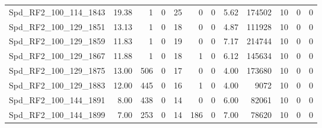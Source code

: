 \begin{longtable}[c]{@{}lrrrrrrrrrrr@{}}
Spd\_RF2\_100\_114\_1843     & 19.38                  & 1                       & 0                       & 25                     & 0                       & 0                       & 5.62                    & 174502                   & 10                       & 0                        & 0                        \\
Spd\_RF2\_100\_129\_1851     & 13.13                  & 1                       & 0                       & 18                     & 0                       & 0                       & 4.87                    & 111928                   & 10                       & 0                        & 0                        \\
Spd\_RF2\_100\_129\_1859     & 11.83                  & 1                       & 0                       & 19                     & 0                       & 0                       & 7.17                    & 214744                   & 10                       & 0                        & 0                        \\
Spd\_RF2\_100\_129\_1867     & 11.88                  & 1                       & 0                       & 18                     & 1                       & 0                       & 6.12                    & 145634                   & 10                       & 0                        & 0                        \\
Spd\_RF2\_100\_129\_1875     & 13.00                  & 506                     & 0                       & 17                     & 0                       & 0                       & 4.00                    & 173680                   & 10                       & 0                        & 0                        \\
Spd\_RF2\_100\_129\_1883     & 12.00                  & 445                     & 0                       & 16                     & 1                       & 0                       & 4.00                    & 9072                     & 10                       & 0                        & 0                        \\
Spd\_RF2\_100\_144\_1891     & 8.00                   & 438                     & 0                       & 14                     & 0                       & 0                       & 6.00                    & 82061                    & 10                       & 0                        & 0                        \\
Spd\_RF2\_100\_144\_1899     & 7.00                   & 253                     & 0                       & 14                     & 186                     & 0                       & 7.00                    & 78620                    & 10                       & 0                        & 0                        \\

\end{longtable}
